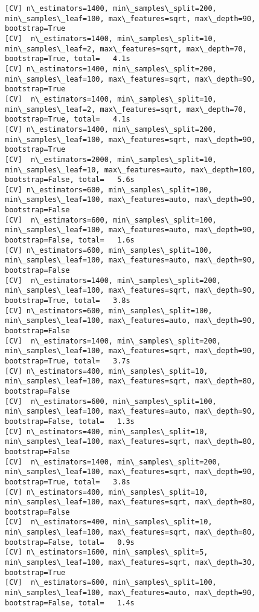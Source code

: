 \documentclass[11pt]{article}
\begin{document}
\begin{Verbatim}[commandchars=\\\{\}]
[CV] n\_estimators=1400, min\_samples\_split=200, min\_samples\_leaf=100, max\_features=sqrt, max\_depth=90, bootstrap=True 
[CV]  n\_estimators=1400, min\_samples\_split=10, min\_samples\_leaf=2, max\_features=sqrt, max\_depth=70, bootstrap=True, total=   4.1s
[CV] n\_estimators=1400, min\_samples\_split=200, min\_samples\_leaf=100, max\_features=sqrt, max\_depth=90, bootstrap=True 
[CV]  n\_estimators=1400, min\_samples\_split=10, min\_samples\_leaf=2, max\_features=sqrt, max\_depth=70, bootstrap=True, total=   4.1s
[CV] n\_estimators=1400, min\_samples\_split=200, min\_samples\_leaf=100, max\_features=sqrt, max\_depth=90, bootstrap=True 
[CV]  n\_estimators=2000, min\_samples\_split=10, min\_samples\_leaf=10, max\_features=auto, max\_depth=100, bootstrap=False, total=   5.6s
[CV] n\_estimators=600, min\_samples\_split=100, min\_samples\_leaf=100, max\_features=auto, max\_depth=90, bootstrap=False 
[CV]  n\_estimators=600, min\_samples\_split=100, min\_samples\_leaf=100, max\_features=auto, max\_depth=90, bootstrap=False, total=   1.6s
[CV] n\_estimators=600, min\_samples\_split=100, min\_samples\_leaf=100, max\_features=auto, max\_depth=90, bootstrap=False 
[CV]  n\_estimators=1400, min\_samples\_split=200, min\_samples\_leaf=100, max\_features=sqrt, max\_depth=90, bootstrap=True, total=   3.8s
[CV] n\_estimators=600, min\_samples\_split=100, min\_samples\_leaf=100, max\_features=auto, max\_depth=90, bootstrap=False 
[CV]  n\_estimators=1400, min\_samples\_split=200, min\_samples\_leaf=100, max\_features=sqrt, max\_depth=90, bootstrap=True, total=   3.7s
[CV] n\_estimators=400, min\_samples\_split=10, min\_samples\_leaf=100, max\_features=sqrt, max\_depth=80, bootstrap=False 
[CV]  n\_estimators=600, min\_samples\_split=100, min\_samples\_leaf=100, max\_features=auto, max\_depth=90, bootstrap=False, total=   1.3s
[CV] n\_estimators=400, min\_samples\_split=10, min\_samples\_leaf=100, max\_features=sqrt, max\_depth=80, bootstrap=False 
[CV]  n\_estimators=1400, min\_samples\_split=200, min\_samples\_leaf=100, max\_features=sqrt, max\_depth=90, bootstrap=True, total=   3.8s
[CV] n\_estimators=400, min\_samples\_split=10, min\_samples\_leaf=100, max\_features=sqrt, max\_depth=80, bootstrap=False 
[CV]  n\_estimators=400, min\_samples\_split=10, min\_samples\_leaf=100, max\_features=sqrt, max\_depth=80, bootstrap=False, total=   0.9s
[CV] n\_estimators=1600, min\_samples\_split=5, min\_samples\_leaf=100, max\_features=sqrt, max\_depth=30, bootstrap=True 
[CV]  n\_estimators=600, min\_samples\_split=100, min\_samples\_leaf=100, max\_features=auto, max\_depth=90, bootstrap=False, total=   1.4s

\end{Verbatim}
\end{document}
